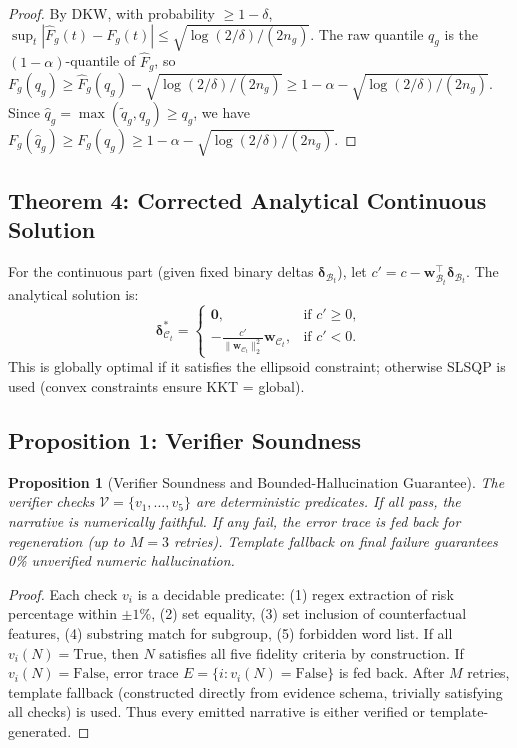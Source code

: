 \documentclass[11pt,a4paper]{article}
\theoremstyle{plain}
\newtheorem{proposition}{Proposition}
\begin{document}
\begin{proof}
By DKW, with probability $\ge 1-\delta$, $\sup_t |\hat F_g(t)-F_g(t)| \le \sqrt{\log(2/\delta)/(2n_g)}$. The raw quantile $q_g$ is the $(1-\alpha)$-quantile of $\hat F_g$, so $F_g(q_g) \ge \hat F_g(q_g) - \sqrt{\log(2/\delta)/(2n_g)} \ge 1-\alpha - \sqrt{\log(2/\delta)/(2n_g)}$. Since $\hat q_g = \max(\tilde q_g, q_g) \ge q_g$, we have $F_g(\hat q_g) \ge F_g(q_g) \ge 1-\alpha - \sqrt{\log(2/\delta)/(2n_g)}$.
\end{proof}

\subsection{Theorem 4: Corrected Analytical Continuous Solution}

For the continuous part (given fixed binary deltas $\boldsymbol\delta_{\mathcal B_t}$), let $c' = c - \mathbf w_{\mathcal B_t}^\top \boldsymbol\delta_{\mathcal B_t}$. The analytical solution is:
\begin{equation}
\boldsymbol\delta_{\mathcal C_t}^* = \begin{cases} \mathbf 0, & \text{if } c' \ge 0, \\ -\frac{c'}{\|\mathbf w_{\mathcal C_t}\|_2^2}\mathbf w_{\mathcal C_t}, & \text{if } c' < 0. \end{cases}
\end{equation}
This is globally optimal if it satisfies the ellipsoid constraint; otherwise SLSQP is used (convex constraints ensure KKT = global).

\subsection{Proposition 1: Verifier Soundness}

\begin{proposition}[Verifier Soundness and Bounded-Hallucination Guarantee]
The verifier checks $\mathcal V=\{v_1,\dots,v_5\}$ are deterministic predicates. If all pass, the narrative is numerically faithful. If any fail, the error trace is fed back for regeneration (up to $M=3$ retries). Template fallback on final failure guarantees 0\% unverified numeric hallucination.
\end{proposition}

\begin{proof}
Each check $v_i$ is a decidable predicate: (1) regex extraction of risk percentage within $\pm 1\%$, (2) set equality, (3) set inclusion of counterfactual features, (4) substring match for subgroup, (5) forbidden word list. If all $v_i(N)=\text{True}$, then $N$ satisfies all five fidelity criteria by construction. If $v_i(N)=\text{False}$, error trace $E=\{i:v_i(N)=\text{False}\}$ is fed back. After $M$ retries, template fallback (constructed directly from evidence schema, trivially satisfying all checks) is used. Thus every emitted narrative is either verified or template-generated.
\end{proof}
\end{document}
